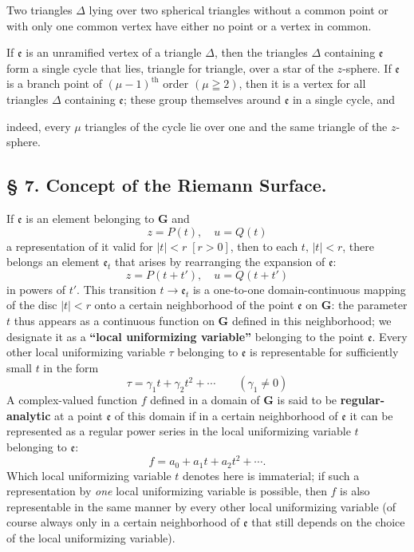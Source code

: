 \documentclass{article}
\begin{document}
Two triangles $\Delta$ lying over two spherical triangles without a common point or with only one common vertex have either no point or a vertex in common.

If $\mathfrak{e}$ is an unramified vertex of a triangle $\Delta$, then the triangles $\Delta$ containing $\mathfrak{e}$ form a single cycle that lies, triangle for triangle, over a star of the $z$-sphere. If $\mathfrak{e}$ is a branch point of $(\mu - 1)^{\text{th}}$ order $(\mu \geqq 2)$, then it is a vertex for all triangles $\Delta$ containing $\mathfrak{e}$; these group themselves around $\mathfrak{e}$ in a single cycle, and

indeed, every $\mu$ triangles of the cycle lie over one and the same triangle of the $z$-sphere.

\subsection*{§ 7. Concept of the Riemann Surface.}

If $\mathfrak{e}$ is an element belonging to $\mathbf{G}$ and
\[ z = P(t), \quad u = Q(t) \]
a representation of it valid for $|t| < r\;[r > 0]$, then to each $t,\,|t| < r$, there belongs an element $\mathfrak{e}_t$ that arises by rearranging the expansion of $\mathfrak{e}$:
\[ z = P(t + t'), \quad u = Q(t + t') \]
in powers of $t'$. This transition $t \to \mathfrak{e}_t$ is a one-to-one domain-continuous mapping of the disc $|t| < r$ onto a certain neighborhood of the point $\mathfrak{e}$ on $\mathbf{G}$: the parameter $t$ thus appears as a continuous function on $\mathbf{G}$ defined in this neighborhood; we designate it as a \textbf{``local uniformizing variable''} belonging to the point $\mathfrak{e}$. Every other local uniformizing variable $\tau$ belonging to $\mathfrak{e}$ is representable for sufficiently small $t$ in the form
\[ \tau = \gamma_1 t + \gamma_2 t^2 + \cdots \qquad (\gamma_1 \neq 0) \]
A complex-valued function $f$ defined in a domain of $\mathbf{G}$ is said to be \textbf{regular-analytic} at a point $\mathfrak{e}$ of this domain if in a certain neighborhood of $\mathfrak{e}$ it can be represented as a regular power series in the local uniformizing variable $t$ belonging to $\mathfrak{e}$:
\[ f = a_0 + a_1 t + a_2 t^2 + \cdots. \]
Which local uniformizing variable $t$ denotes here is immaterial; if such a representation by \emph{one} local uniformizing variable is possible, then $f$ is also representable in the same manner by every other local uniformizing variable (of course always only in a certain neighborhood of $\mathfrak{e}$ that still depends on the choice of the local uniformizing variable).
\end{document}
